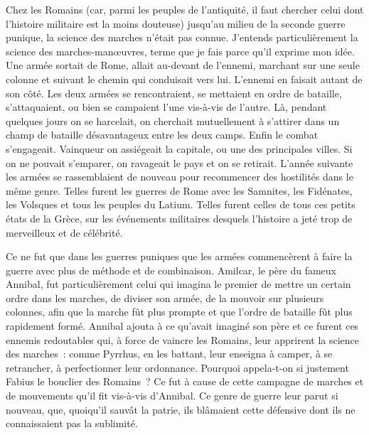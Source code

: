 \documentclass[french,twoside]{book} %
\begin{document}
Chez les Romains (car, parmi les peuples de l’antiquité, il faut chercher celui dont l’histoire militaire est la moins douteuse) jusqu’au milieu de la seconde guerre punique, la science des marches n’était pas connue. J’entends particulièrement la science des marches-manœuvres, terme que je fais parce qu’il exprime mon idée. Une armée sortait de Rome, allait au-devant de l’ennemi, marchant sur une seule colonne et suivant le chemin qui conduisait vers lui. L’ennemi en faisait autant de son côté. Les deux armées se rencontraient, se mettaient en ordre de bataille, s’attaquaient, ou bien se campaient l’une vis-à-vis de l’autre. Là, pendant quelques jours on se harcelait, on cherchait mutuellement à s’attirer dans un champ de bataille désavantageux entre les deux camps. Enfin le combat s’engageait. Vainqueur on assiégeait la capitale, ou une des principales villes. Si on ne pouvait s’emparer, on ravageait le pays et on se retirait. L’année suivante les armées se rassemblaient de nouveau pour recommencer des hostilités dans le même genre. Telles furent les guerres de Rome avec les Samnites, les Fidénates, les Volsques et tous les peuples du Latium. Telles furent celles de tous ces petits états de la Grèce, sur les événements militaires desquels l’histoire a jeté trop de merveilleux et de célébrité.\par
Ce ne fut que dans les guerres puniques que les armées commencèrent à faire la guerre avec plus de méthode et de combinaison. Amilcar, le père du fameux Annibal, fut particulièrement celui qui imagina le premier de mettre un certain ordre dans les marches, de diviser son armée, de la mouvoir sur plusieurs colonnes, afin que la marche fût plus prompte et que l’ordre de bataille fût plus rapidement formé. Annibal ajouta à ce qu’avait imaginé son père et ce furent ces ennemis redoutables qui, à force de vaincre les Romains, leur apprirent la science des marches : comme Pyrrhus, en les battant, leur enseigna à camper, à se retrancher, à perfectionner leur ordonnance. Pourquoi appela-t-on si justement Fabius le bouclier des Romains ? Ce fut à cause de cette campagne de marches et de mouvements qu’il fit vis-à-vis d’Annibal. Ce genre de guerre leur parut si nouveau, que, quoiqu’il sauvât la patrie, ils blâmaient cette défensive dont ils ne connaissaient pas la sublimité.\par
\end{document}
